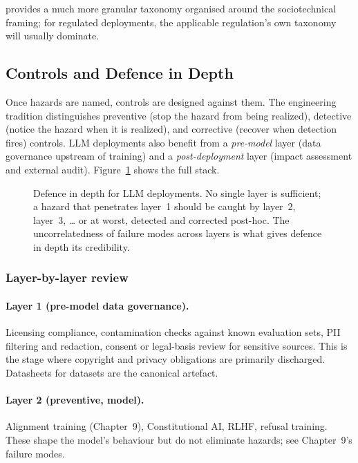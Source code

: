 \citet{weidinger2023sociotechnical} provides a much more
granular taxonomy organised around the sociotechnical
framing; for regulated deployments, the applicable regulation's
own taxonomy will usually dominate.

\subsection{Controls and Defence in Depth}

Once hazards are named, controls are designed against them. The
engineering tradition distinguishes preventive (stop the
hazard from being realized), detective (notice the hazard
when it is realized), and corrective (recover when detection
fires) controls. LLM deployments also benefit from a
\emph{pre-model} layer (data governance upstream of training)
and a \emph{post-deployment} layer (impact assessment and
external audit). Figure~\ref{fig:controls-layers} shows the full
stack.

\begin{figure}[ht]
  \centering
  
  \caption{Defence in depth for LLM deployments. No single layer is
  sufficient; a hazard that penetrates layer~1 should be caught
  by layer~2, layer~3, \dots{} or at worst, detected and
  corrected post-hoc. The uncorrelatedness of failure modes
  across layers is what gives defence in depth its credibility.}
  \label{fig:controls-layers}
\end{figure}

\subsubsection{Layer-by-layer review}

\paragraph{Layer 1 (pre-model data governance).} Licensing
compliance, contamination checks against known evaluation sets,
PII filtering and redaction, consent or legal-basis review for
sensitive sources. This is the stage where copyright and
privacy obligations are primarily discharged. Datasheets for
datasets \citep{gebru2021datasheets} are the canonical
artefact.

\paragraph{Layer 2 (preventive, model).} Alignment training
(Chapter~9), Constitutional AI, RLHF, refusal training. These
shape the model's behaviour but do not eliminate hazards; see
Chapter~9's failure modes.


